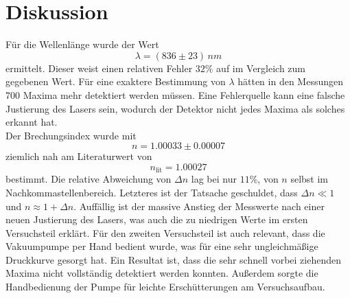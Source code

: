 \section{Diskussion}
\label{sec:Diskussion}

Für die Wellenlänge wurde der Wert
\[
	\lambda = (836 \pm 23) \, \si{nm}
\]
ermittelt. Dieser weist einen relativen Fehler $32\%$ auf im Vergleich zum gegebenen Wert. 
Für eine exaktere Bestimmung
von $\lambda$ hätten in den Messungen 700 Maxima mehr detektiert werden müssen. Eine
Fehlerquelle kann eine falsche Justierung des Lasers sein, wodurch der Detektor nicht
jedes Maxima als solches erkannt hat.
\\
Der Brechungsindex wurde mit 
\[
	n = 1.00033 \pm 0.00007 
\]
ziemlich nah am Literaturwert \cite{reflactiveindex} von
\[
	n_\text{lit} = 1.00027
\]
bestimmt. Die relative Abweichung von $\Delta n$ lag bei nur $11\%$, von $n$ selbst im
Nachkommastellenbereich. Letzteres ist der Tatsache geschuldet, dass $\Delta n \ll 1$ und 
$n \approx 1 + \Delta n$.
Auffällig ist der massive Anstieg der Messwerte nach einer neuen Justierung des Lasers,
was auch die zu niedrigen Werte im ersten Versuchsteil erklärt. Für den zweiten
Versuchsteil ist auch relevant, dass die Vakuumpumpe per Hand bedient wurde, was für eine
sehr ungleichmäßige Druckkurve gesorgt hat. Ein Resultat ist, dass die sehr schnell vorbei
ziehenden Maxima nicht vollständig detektiert werden konnten. Außerdem sorgte die
Handbedienung der Pumpe für leichte Erschütterungen am Versuchsaufbau.

